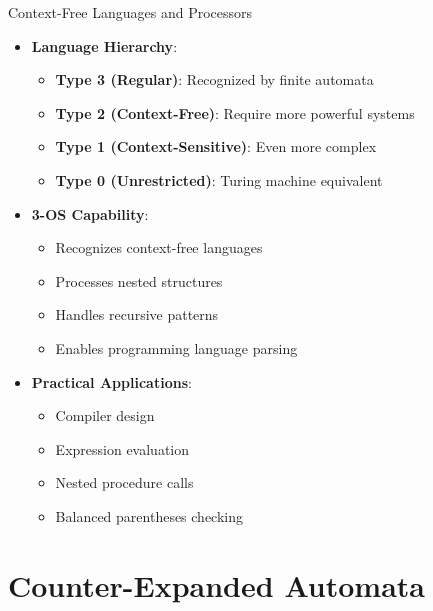 \documentclass[aspectratio=169,11pt]{beamer}
\newcommand{\concept}[1]{\textbf{\color{accentcolor}#1}}
\begin{document}
\begin{frame}{Context-Free Languages and Processors}
\begin{itemize}
\item \concept{Language Hierarchy}:
\begin{itemize}
\item \textbf{Type 3 (Regular)}: Recognized by finite automata
\item \textbf{Type 2 (Context-Free)}: Require more powerful systems
\item \textbf{Type 1 (Context-Sensitive)}: Even more complex
\item \textbf{Type 0 (Unrestricted)}: Turing machine equivalent
\end{itemize}
\vspace{0.5cm}
\item \concept{3-OS Capability}:
\begin{itemize}
\item Recognizes context-free languages
\item Processes nested structures
\item Handles recursive patterns
\item Enables programming language parsing
\end{itemize}
\vspace{0.3cm}
\item \concept{Practical Applications}:
\begin{itemize}
\item Compiler design
\item Expression evaluation
\item Nested procedure calls
\item Balanced parentheses checking
\end{itemize}
\end{itemize}
\end{frame}

\section{Counter-Expanded Automata}
\end{document}
